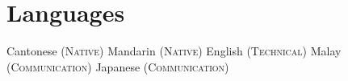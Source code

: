 \section{Languages}\vspace{0.15cm}
Cantonese   \textsc{(Native)}
Mandarin    \textsc{(Native)}
English     \textsc{(Technical)}
Malay       \textsc{(Communication)}
Japanese    \textsc{(Communication)}